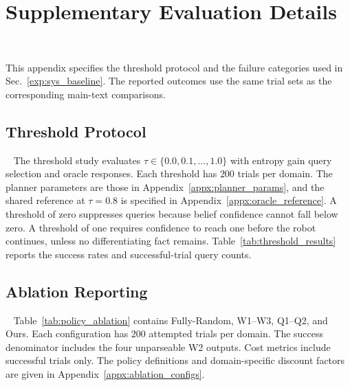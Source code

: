 \section{Supplementary Evaluation Details}~\label{appx:exp}

This appendix specifies the threshold protocol and the failure categories used in Sec.~\ref{exp:sys_baseline}. The reported outcomes use the same trial sets as the corresponding main-text comparisons.

\subsection{Threshold Protocol}~\label{appx:threshold_exp}
The threshold study evaluates $\tau\in\{0.0,0.1,\ldots,1.0\}$ with entropy gain query selection and oracle responses. Each threshold has $200$ trials per domain. The planner parameters are those in Appendix~\ref{appx:planner_params}, and the shared reference at $\tau=0.8$ is specified in Appendix~\ref{appx:oracle_reference}. A threshold of zero suppresses queries because belief confidence cannot fall below zero. A threshold of one requires confidence to reach one before the robot continues, unless no differentiating fact remains. Table~\ref{tab:threshold_results} reports the success rates and successful-trial query counts.

\subsection{Ablation Reporting}~\label{appx:policy_comparison}
Table~\ref{tab:policy_ablation} contains Fully-Random, W1--W3, Q1--Q2, and Ours. Each configuration has $200$ attempted trials per domain. The success denominator includes the four unparseable W2 outputs. Cost metrics include successful trials only. The policy definitions and domain-specific discount factors are given in Appendix~\ref{appx:ablation_configs}.

\subsection{}~\label{appx:oracle_budget_audit}

